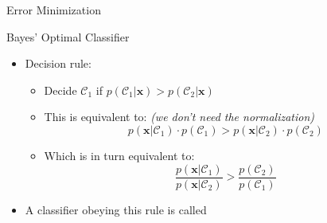 \begin{frame}{Error Minimization}{}
\end{frame}


\begin{frame}{Bayes' Optimal Classifier}{}
	\begin{itemize}
		\item Decision rule:
		\begin{itemize}
			\item Decide $\mathcal{C}_1$ if $p(\mathcal{C}_1 \vert \bm{x}) > p(\mathcal{C}_2 \vert \bm{x})$
			\item This is equivalent to: \textit{(we don't need the normalization)}
			\begin{equation}
				p(\bm{x} \vert \mathcal{C}_1) \cdot p(\mathcal{C}_1) >
					p(\bm{x} \vert \mathcal{C}_2) \cdot p(\mathcal{C}_2)
			\end{equation} 
			\item Which is in turn equivalent to:
			\begin{equation}
				\frac{p(\bm{x} \vert \mathcal{C}_1)}{p(\bm{x} \vert \mathcal{C}_2)} >
					\frac{p(\mathcal{C}_2)}{p(\mathcal{C}_1)}
			\end{equation}
		\end{itemize}
		\item A classifier obeying this rule is called 
	\end{itemize}
\end{frame}


